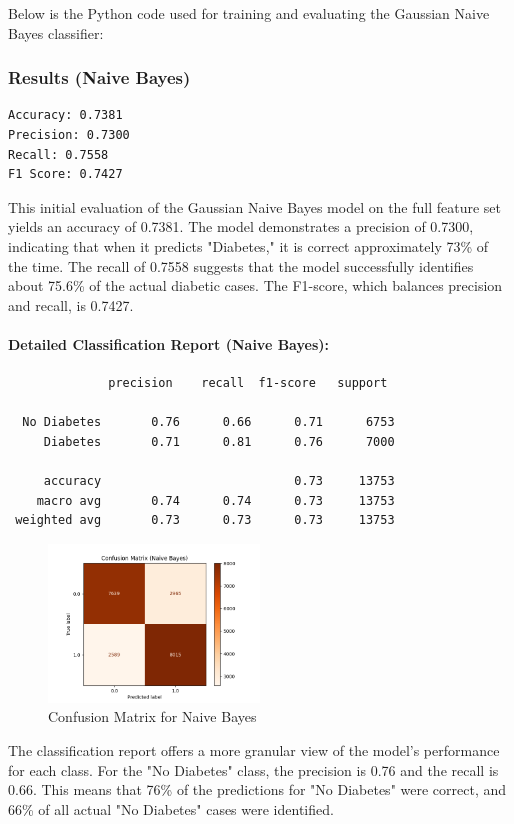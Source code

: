 Below is the Python code used for training and evaluating the Gaussian Naive Bayes classifier:



\subsubsection{Results (Naive Bayes)}

\begin{verbatim}
Accuracy: 0.7381
Precision: 0.7300
Recall: 0.7558
F1 Score: 0.7427
\end{verbatim}
This initial evaluation of the Gaussian Naive Bayes model on the full feature set yields an accuracy of 0.7381. The model demonstrates a precision of 0.7300, indicating that when it predicts "Diabetes," it is correct approximately 73\% of the time. The recall of 0.7558 suggests that the model successfully identifies about 75.6\% of the actual diabetic cases. The F1-score, which balances precision and recall, is 0.7427.

\paragraph*{Detailed Classification Report (Naive Bayes):}
\begin{verbatim}
              precision    recall  f1-score   support

  No Diabetes       0.76      0.66      0.71      6753
     Diabetes       0.71      0.81      0.76      7000

     accuracy                           0.73     13753
    macro avg       0.74      0.74      0.73     13753
 weighted avg       0.73      0.73      0.73     13753
\end{verbatim}

\begin{figure}[H]
    \centering
    \includegraphics[width=0.5\textwidth]{images/Figure_1.png}
    \caption{Confusion Matrix for Naive Bayes}
\end{figure}
The classification report offers a more granular view of the model's performance for each class. For the "No Diabetes" class, the precision is 0.76 and the recall is 0.66. This means that 76\% of the predictions for "No Diabetes" were correct, and 66\% of all actual "No Diabetes" cases were identified.

